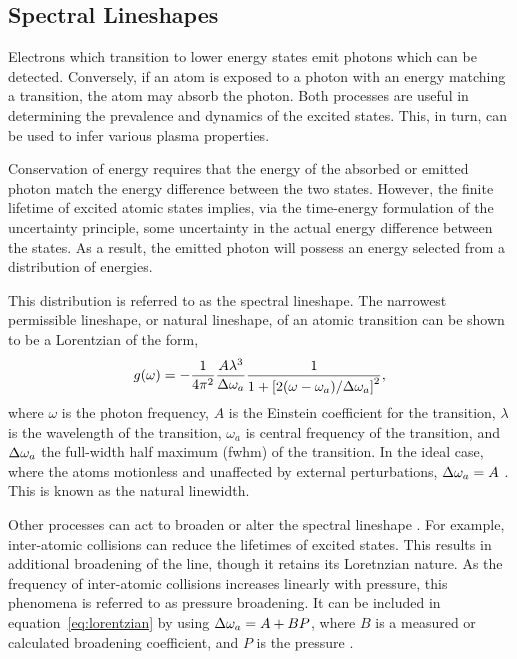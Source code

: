\subsection{Spectral Lineshapes}

Electrons which transition to lower energy states emit photons which can be
detected. Conversely, if an atom is exposed to a photon with an energy matching
a transition, the atom may absorb the photon. Both processes are useful in
determining the prevalence and dynamics of the excited states. This, in turn,
can be used to infer various plasma properties.

Conservation of energy requires that the energy of the absorbed or emitted
photon match the energy difference between the two states. However, the finite
lifetime of excited atomic states implies, via the time-energy formulation of
the uncertainty principle, some uncertainty in the actual energy difference
between the states. As a result, the emitted photon will possess an energy
selected from a distribution of energies.

This distribution is referred to as the spectral lineshape. The narrowest
permissible lineshape, or natural lineshape, of an atomic transition can be
shown \cite{Siegman1986} to be a Lorentzian of the form,
\begin{equation}
  g(\omega) = -\frac{1}{4\pi^2}\frac{A\lambda^3}{\Delta \omega_a}
  \frac{1}{1 + \left[2(\omega-\omega_a)/\Delta \omega_a\right]^2},
  \label{eq:lorentzian}
\end{equation}
where $\omega$ is the photon frequency, $A$ is the Einstein coefficient for the
transition, $\lambda$ is the wavelength of the transition, $\omega_a$ is central
frequency of the transition, and $\Delta \omega_a$ the full-width half maximum (\acs{fwhm})
of the transition. In the ideal case, where the atoms motionless and unaffected
by external perturbations, $\Delta \omega_a = A$ \cite{Siegman1986}. This is known as the
natural linewidth.

Other processes can act to broaden or alter the spectral lineshape
\cite{Kunze2009}. For example, inter-atomic collisions can reduce the lifetimes
of excited states. This results in additional broadening of the line, though it
retains its Loretnzian nature. As the frequency of inter-atomic collisions
increases linearly with pressure, this phenomena is referred to as pressure
broadening. It can be included in equation~\ref{eq:lorentzian} by using $\Delta \omega_a =
A + BP$, where $B$ is a measured or calculated broadening coefficient, and $P$
is the pressure \cite{Siegman1986}.

